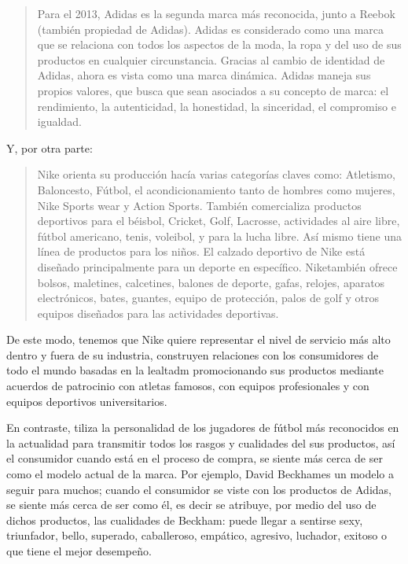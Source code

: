 \documentclass[a4paper,12pt]{article}
\begin{document}
\begin{quotation}
	Para el 2013, Adidas es la segunda marca más reconocida, junto a Reebok
(también propiedad de Adidas). Adidas es considerado como una marca que se
relaciona con todos los aspectos de la moda, la ropa y del uso de sus productos
en cualquier circunstancia. Gracias al cambio de identidad de Adidas, ahora es
vista como una marca dinámica. Adidas maneja sus propios valores, que busca
que sean asociados a su concepto de marca: el rendimiento, la autenticidad, la
honestidad, la sinceridad, el compromiso e igualdad.
\end{quotation}
Y, por otra parte:
\begin{quotation}
	Nike orienta su producción hacía varias categorías claves como: Atletismo,
Baloncesto, Fútbol, el acondicionamiento tanto de hombres como mujeres, Nike
Sports wear y Action Sports. También comercializa productos deportivos para el
béisbol, Cricket, Golf, Lacrosse, actividades al aire libre, fútbol americano, tenis,
voleibol, y para la lucha libre. Así mismo tiene una línea de productos para los
niños. El calzado deportivo de Nike está diseñado principalmente para un deporte
en específico. Niketambién ofrece bolsos, maletines, calcetines, balones de
deporte, gafas, relojes, aparatos electrónicos, bates, guantes, equipo de
protección, palos de golf y otros equipos diseñados para las actividades
deportivas.
\end{quotation}

De este modo, tenemos que Nike quiere representar el nivel de servicio más alto dentro y fuera
de su industria, construyen relaciones con los consumidores de todo el mundo
basadas en la lealtadm promocionando sus productos mediante acuerdos de
patrocinio con atletas famosos, con equipos profesionales y con equipos
deportivos universitarios.\par
En contraste, tiliza la personalidad de los jugadores de fútbol más
reconocidos en la actualidad para transmitir todos los rasgos y cualidades del sus
productos, así el consumidor cuando está en el proceso de compra, se siente más
cerca de ser como el modelo actual de la marca. Por ejemplo, David Beckhames
un modelo a seguir para muchos; cuando el consumidor se viste con los productos
de Adidas, se siente más cerca de ser como él, es decir se atribuye, por medio del
uso de dichos productos, las cualidades de Beckham: puede llegar a sentirse
sexy, triunfador, bello, superado, caballeroso, empático, agresivo, luchador,
exitoso o que tiene el mejor desempeño.\par
\end{document}

